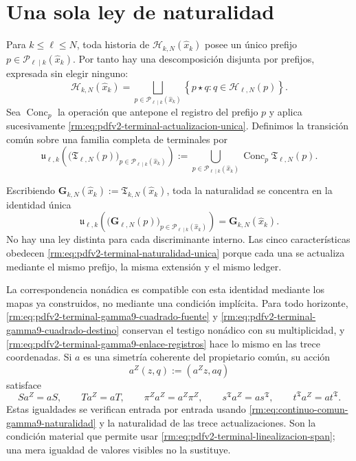 \section{Una sola ley de naturalidad}

Para \(k\leq\ell\leq N\), toda historia de
\(\mathscr H_{k,N}(\widehat x_k)\) posee un \'unico prefijo
\(p\in\mathscr P_{\ell\mid k}(\widehat x_k)\). Por tanto hay una descomposici\'on
disjunta por prefijos, expresada sin elegir ninguno:
\begin{equation}
\label{rm:eq:pdfv2-terminal-particion-historias}
 \mathscr H_{k,N}(\widehat x_k)
 =\bigsqcup_{p\in\mathscr P_{\ell\mid k}(\widehat x_k)}
 \left\{p\star q:q\in\mathscr H_{\ell,N}(p)\right\}.
\end{equation}
Sea \(\operatorname{Conc}_p\) la operaci\'on que antepone el registro del
prefijo \(p\) y aplica sucesivamente
\eqref{rm:eq:pdfv2-terminal-actualizacion-unica}. Definimos la transici\'on
com\'un sobre una familia completa de terminales por
\begin{equation}
\label{rm:eq:pdfv2-terminal-transicion-comun}
 \mathfrak u_{\ell,k}
 \left(
   \bigl(\mathfrak T_{\ell,N}(p)\bigr)_{p\in\mathscr P_{\ell\mid k}(\widehat x_k)}
 \right)
 :=\bigcup_{p\in\mathscr P_{\ell\mid k}(\widehat x_k)}
   \operatorname{Conc}_p\mathfrak T_{\ell,N}(p).
\end{equation}

Escribiendo
\(\mathbf G_{k,N}(\widehat x_k):=\mathfrak T_{k,N}(\widehat x_k)\), toda la naturalidad se
concentra en la identidad \'unica
\begin{equation}
\label{rm:eq:pdfv2-terminal-naturalidad-unica}
 \boxed{
 \mathfrak u_{\ell,k}
 \left(
   \bigl(\mathbf G_{\ell,N}(p)\bigr)_{p\in\mathscr P_{\ell\mid k}(\widehat x_k)}
 \right)
 =\mathbf G_{k,N}(\widehat x_k).}
\end{equation}
No hay una ley distinta para cada discriminante interno. Las cinco
caracter\'isticas obedecen
\eqref{rm:eq:pdfv2-terminal-naturalidad-unica} porque cada una se actualiza
mediante el mismo prefijo, la misma extensi\'on y el mismo ledger.

La correspondencia non\'adica es compatible con esta identidad mediante los
mapas ya construidos, no mediante una condici\'on impl\'icita. Para todo
horizonte, \eqref{rm:eq:pdfv2-terminal-gamma9-cuadrado-fuente} y
\eqref{rm:eq:pdfv2-terminal-gamma9-cuadrado-destino} conservan el testigo
non\'adico con su multiplicidad, y
\eqref{rm:eq:pdfv2-terminal-gamma9-enlace-registros} hace lo mismo en las
trece coordenadas. Si \(a\) es una simetr\'ia coherente del propietario
com\'un, su acci\'on
\[
 a^Z(z,q):=(a^Zz,aq)
\]
satisface
\begin{equation}
\label{rm:eq:pdfv2-terminal-gamma9-equivarianza-completa}
 S a^Z=aS,\qquad T a^Z=aT,\qquad
 \pi^Za^Z=a^Z\pi^Z,\qquad
 s^{\mathfrak T}a^Z=as^{\mathfrak T},\qquad
 t^{\mathfrak T}a^Z=at^{\mathfrak T}.
\end{equation}
Estas igualdades se verifican entrada por entrada usando
\eqref{rm:eq:continuo-comun-gamma9-naturalidad} y la naturalidad de las trece
actualizaciones. Son la condici\'on material que permite usar
\eqref{rm:eq:pdfv2-terminal-linealizacion-span}; una mera igualdad de valores
visibles no la sustituye.

